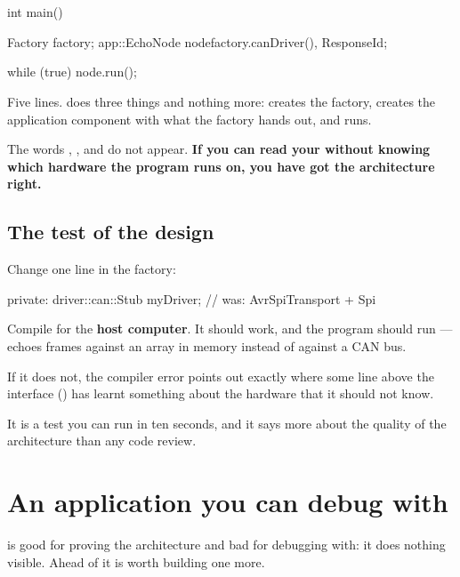 \section{\texorpdfstring{}{main}}
\label{sec:main}

\begin{cppcode}
int main()
{
    Factory factory{};
    app::EchoNode node{factory.canDriver(), ResponseId};

    while (true)
    {
        node.run();
    }
}
\end{cppcode}

Five lines.  does three things and nothing more: creates the factory, creates the
application component with what the factory hands out, and runs.

The words , ,  and  do not appear.
\textbf{If you can read your  without knowing which hardware the program runs on, you
have got the architecture right.}

\subsection{The test of the design}

Change one line in the factory:

\begin{cppcode}
private:
    driver::can::Stub myDriver;   // was: AvrSpiTransport + Spi
\end{cppcode}

Compile for the \textbf{host computer}. It should work, and the program should run ---
 echoes frames against an array in memory instead of against a CAN bus.

If it does not, the compiler error points out exactly where some line above the interface
() has learnt something about the hardware that it should not know.

It is a test you can run in ten seconds, and it says more about the quality of the architecture
than any code review.

\section{An application you can debug with}
\label{sec:debugapp}

 is good for proving the architecture and bad for debugging with: it does nothing
visible. Ahead of  it is worth building one more.

